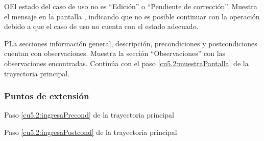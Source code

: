  \begin{UCtrayectoriaA}{O}{El estado del caso de uso no es ``Edición'' o ``Pendiente de corrección''.}
    \UCpaso[\UCsist] Muestra el mensaje  en la pantalla , indicando que no es posible
	continuar con la operación debido a que el caso de uso no cuenta con el estado adecuado.
 \end{UCtrayectoriaA}
 \begin{UCtrayectoriaA}{P}{La secciones información general, descripción, precondiciones y postcondiciones cuentan con observaciones.}
    \UCpaso[\UCsist] Muestra la sección ``Observaciones'' con las observaciones encontradas.
	\UCpaso[] Continúa con el paso \ref{cu5.2:muestraPantalla} de la trayectoria principal.
 \end{UCtrayectoriaA}
 

 

\subsubsection{Puntos de extensión}	
	{Paso \ref{cu5.2:ingresaPrecond} de la trayectoria principal}
	{}
	
	{Paso \ref{cu5.2:ingresaPostcond} de la trayectoria principal}
	{}